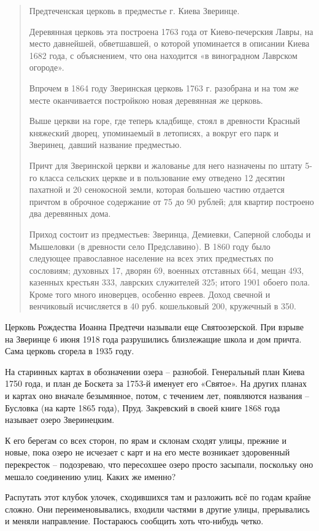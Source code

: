 \begin{quotation}
Предтеченская церковь в предместье г. Киева Зверинце.

Деревянная церковь эта построена 1763 года от Киево-печерския Лавры, на место давнейшей, обветшавшей, о которой упоминается в описании Киева 1682 года, с объяснением, что она находится «в виноградном Лаврском огороде».

Впрочем в 1864 году Зверинская церковь 1763 г. разобрана и на том же месте оканчивается постройкою новая деревянная же церковь.

Выше церкви на горе, где теперь кладбище, стоял в древности Красный княжеский дворец, упоминаемый в летописях, а вокруг его парк и Зверинец, давший название предместью. 

Причт для Зверинской церкви и жалованье для него назначены по штату 5-го класса сельских церкве и в пользование ему отведено 12 десятин пахатной и 20 сенокосной земли, которая большею частию отдается причтом в оброчное содержание от 75 до 90 рублей; для квартир построено два деревянных дома. 

Приход состоит из предместьев: Зверинца, Демиевки, Саперной слободы и Мышеловки (в древности село Предславино). В 1860 году было следующее православное население на всех этих предместьях по сословиям; духовных 17, дворян 69, военных отставных 664, мещан 493, казенных крестьян 333, лаврских служителей 325; итого 1901 обоего пола. Кроме того много иноверцев, особенно евреев. Доход свечной и венчиковый исчисляется в 40 руб. кошельковый 200, кружечный в 350.
\end{quotation}

Церковь Рождества Иоанна Предтечи называли еще Святоозерской. При взрыве на Зверинце 6 июня 1918 года разрушились близлежащие школа и дом причта. Сама церковь сгорела в 1935 году.

На старинных картах в обозначении озера – разнобой. Генеральный план Киева 1750 года, и план де Боскета за 1753-й именует его «Святое». На других планах и картах оно вначале безымянное, потом, с течением лет, появляются названия – Бусловка (на карте 1865 года), Пруд. Закревский в своей книге 1868 года называет озеро Зверинецким. 

К его берегам со всех сторон, по ярам и склонам сходят улицы, прежние и новые, пока озеро не исчезает с карт и на его месте возникает здоровенный перекресток – подозреваю, что пересохшее озеро просто засыпали, поскольку оно мешало соединению улиц. Каких же именно?

Распутать этот клубок улочек, сходившихся там и разложить всё по годам крайне сложно. Они переименовывались, входили частями в другие улицы, прерывались и меняли направление. Постараюсь сообщить хоть что-нибудь четко.

